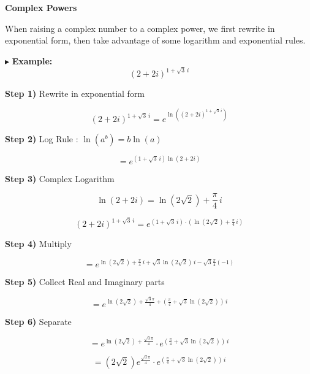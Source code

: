 \documentclass{ximera}
\begin{document}
\begin{procedure} \textbf{\textcolor{purple!85!blue}{Complex Powers}}  


When raising a complex number to a complex power, we first rewrite in exponential form, then take advantage of some logarithm and exponential rules.


$\blacktriangleright$ \textbf{Example:}  
\[  (2+2i)^{1+\sqrt{3} \, i}    \]


\textbf{\textcolor{blue!75!black}{Step 1)}}  Rewrite in exponential form 




\[  (2+2i)^{1+\sqrt{3} \, i}   =        e^{\ln\left( (2+2i)^{1+\sqrt{3} \, i} \right)} \]




\textbf{\textcolor{blue!75!black}{Step 2)}}  Log Rule : $\ln(a^b) = b \ln(a)$ 


\[   =        e^{(1+\sqrt{3} \, i) \ln(2+2i)} \]




\textbf{\textcolor{blue!75!black}{Step 3)}}  Complex Logarithm 


\[   \ln(2+2i) = \ln(2\sqrt{2}) + \frac{\pi}{4} \, i \]



\[   (2+2i)^{1+\sqrt{3} \, i}   =       e^{(1+\sqrt{3} \, i) \cdot (\ln(2\sqrt{2}) + \frac{\pi}{4} \, i)} \]






\textbf{\textcolor{blue!75!black}{Step 4)}}  Multiply 



\[
=    e^{   \ln(2\sqrt{2}) +   \frac{\pi}{4} \, i     +  \sqrt{3} \ln(2\sqrt{2}) \, i - \sqrt{3}  \frac{\pi}{4} (-1) }
\]



\textbf{\textcolor{blue!75!black}{Step 5)}}  Collect Real and Imaginary parts 



\[
=   e^{   \ln(2\sqrt{2}) + \frac{\sqrt{3}\pi}{4} +  (\frac{\pi}{4} + \sqrt{3} \ln(2\sqrt{2}) )  \, i   }
\]




\textbf{\textcolor{blue!75!black}{Step 6)}}  Separate 


\[
=   e^{   \ln(2\sqrt{2}) + \frac{\sqrt{3}\pi}{4}} \cdot  e^{(\frac{\pi}{4} + \sqrt{3} \ln(2\sqrt{2}) )  \, i}
\]





\[
=   (2\sqrt{2})  e^{\frac{\sqrt{3}\pi}{4}} \cdot  e^{(\frac{\pi}{4} + \sqrt{3} \ln(2\sqrt{2}) )  \, i}
\]





\end{procedure}
\end{document}
